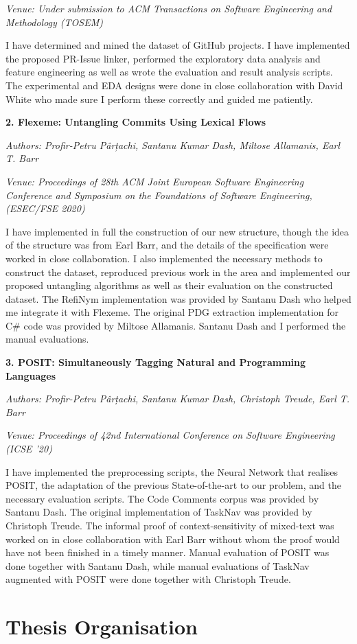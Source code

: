 \noindent\emph{Venue: Under submission to ACM Transactions on Software
Engineering and Methodology (TOSEM)}

\noindent I have determined and mined the dataset of GitHub projects. I have
implemented the proposed PR-Issue linker, performed the exploratory data
analysis and feature engineering as well as wrote the evaluation and result
analysis scripts. The experimental and EDA designs were done in close
collaboration with David White who made sure I perform these correctly and
guided me patiently.

\noindent\textbf{2. Flexeme: Untangling Commits Using Lexical Flows}

\noindent\emph{Authors: Profir-Petru Pârțachi, Santanu Kumar Dash, Miltose
Allamanis, Earl T. Barr}

\noindent\emph{Venue: Proceedings of 28th ACM Joint European Software
Engineering Conference and Symposium on the Foundations of Software Engineering,
(ESEC/FSE 2020)}

\noindent  I have implemented in full the construction of our new structure,
though the idea of the structure was from Earl Barr, and the details of the
specification were worked in close collaboration. I also implemented the
necessary methods to construct the dataset, reproduced previous work in the area
and implemented our proposed untangling algorithms as well as their evaluation
on the constructed dataset. The RefiNym implementation was provided by Santanu
Dash who helped me integrate it with Flexeme. The original PDG extraction
implementation for C\# code was provided by Miltose Allamanis. Santanu Dash and
I performed the manual evaluations.

\noindent\textbf{3. POSIT: Simultaneously Tagging Natural and Programming
Languages} 

\noindent\emph{Authors: Profir-Petru Pârțachi, Santanu Kumar Dash, Christoph
Treude, Earl T. Barr}

\noindent\emph{Venue: Proceedings of 42nd International Conference on Software
Engineering (ICSE ’20)}

\noindent I have implemented the preprocessing scripts, the Neural Network that
realises POSIT, the adaptation of the previous State-of-the-art to our problem,
and the necessary evaluation scripts. The Code Comments corpus was provided by
Santanu Dash. The original implementation of TaskNav was provided by Christoph
Treude. The informal proof of context-sensitivity of mixed-text was worked on in
close collaboration with Earl Barr without whom the proof would have not been
finished in a timely manner. Manual evaluation of POSIT was done together with
Santanu Dash, while manual evaluations of TaskNav augmented with POSIT were done
together with Christoph Treude.

\section{Thesis Organisation}
\label{chapter:introduction:sec:organisation}

